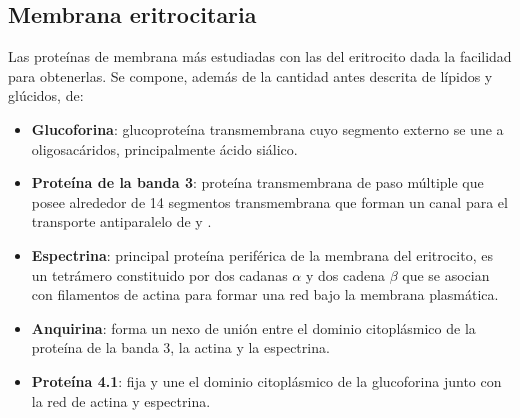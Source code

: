 \subsection{Membrana eritrocitaria}
Las proteínas de membrana más estudiadas con las del eritrocito dada la facilidad para obtenerlas. Se compone, además de la cantidad antes descrita de lípidos y glúcidos, de:
\begin{itemize}[itemsep=0pt,parsep=0pt,topsep=0pt,partopsep=0pt]
    \item \textbf{Glucoforina}: glucoproteína transmembrana cuyo segmento externo se une a oligosacáridos, principalmente ácido siálico.
    \item\textbf{Proteína de la banda 3}: proteína transmembrana de paso múltiple que posee alrededor de 14 segmentos transmembrana que forman un canal para el transporte antiparalelo de  y .
    \item\textbf{Espectrina}: principal proteína periférica de la membrana del eritrocito, es un tetrámero constituido por dos cadanas $\alpha$ y dos cadena $\beta$ que se asocian con filamentos de actina para formar una red bajo la membrana plasmática.
    \item\textbf{Anquirina}: forma un nexo de unión entre el dominio citoplásmico de la proteína de la banda 3, la actina y la espectrina.
    \item\textbf{Proteína 4.1}: fija y une el dominio citoplásmico de la glucoforina junto con la red de actina y espectrina.
\end{itemize}







